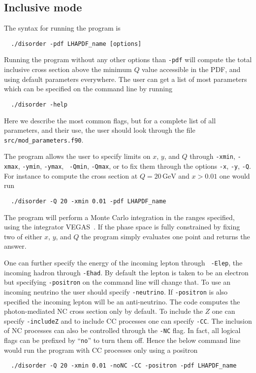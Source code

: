 \documentclass[submission, PhysCodeb]{SciPost_better_arXiv}
\newcommand{\GEV}{\,\mathrm{GeV}}
\begin{document}
\subsection{Inclusive mode}
\label{sec:Inclusive}
The syntax for running the program is
\begin{lstlisting}
  ./disorder -pdf LHAPDF_name [options]
\end{lstlisting}
Running the program without any other options than {\tt -pdf} will
compute the total inclusive cross section above the minimum $Q$ value
accessible in the PDF, and using default parameters everywhere. The
user can get a list of most parameters which can be specified on the
command line by running
\begin{lstlisting}
  ./disorder -help
\end{lstlisting}
Here we describe the most common flags, but for a complete list of all
parameters, and their use, the user should look through the file {\tt
  src/mod\_parameters.f90}.

The program allows the user to specify limits on $x$, $y$, and $Q$
through {\tt -xmin}, {\tt -xmax}, {\tt -ymin}, {\tt -ymax}, {\tt
  -Qmin}, {\tt -Qmax}, or to fix them through the options {\tt -x},
{\tt -y}, {\tt -Q}. For instance to compute the cross section at $Q=20
\GEV$ and $x>0.01$ one would run
\begin{lstlisting}
  ./disorder -Q 20 -xmin 0.01 -pdf LHAPDF_name
\end{lstlisting}
The program will perform a Monte Carlo integration in the ranges
specified, using the integrator VEGAS~\cite{Lepage:1977sw}. If the
phase space is fully constrained by fixing two of either $x$, $y$, and
$Q$ the program simply evaluates one point and returns the answer.

One can further specify the energy of the incoming lepton through {\tt
  -Elep}, the incoming hadron through {\tt -Ehad}. By default the
lepton is taken to be an electron but specifying {\tt -positron} on
the command line will change that. To use an incoming neutrino the
user should specify {\tt -neutrino}. If {\tt -positron} is also
specified the incoming lepton will be an anti-neutrino. The code
computes the photon-mediated NC cross section only by default. To
include the $Z$ one can specify {\tt -includeZ} and to include CC
processes one can specify {\tt -CC}. The inclusion of NC processes can
also be controlled through the {\tt -NC} flag. In fact, all logical
flags can be prefixed by ``{\tt{no}}'' to turn them off. Hence the
below command line would run the program with CC processes only using
a positron
\begin{lstlisting}
  ./disorder -Q 20 -xmin 0.01 -noNC -CC -positron -pdf LHAPDF_name
\end{lstlisting}
\end{document}
